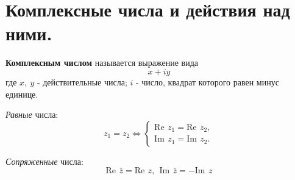 \documentclass[12pt]{extarticle}
\newcommand{\RE}{\mathrm{Re}\,}
\newcommand{\IM}{\mathrm{Im}\,}
\begin{document}
\tableofcontents\newpage

\section{Комплексные числа и действия над ними.}
\textbf{Комплексным числом} называется выражение вида
\begin{displaymath}
x+iy
\end{displaymath}
где $x,\ y$ - действительные числа; $i$ - число, квадрат которого равен
минус единице.
\par \textit{Равные} числа:
\begin{displaymath}
    z_{1}=z_{2} \Leftrightarrow
        \left\{
            \begin{array}{ll}
                \RE\ z_{1} = \RE\ z_{2},\\
                \IM\ z_{1} = \IM\ z_{2}.
            \end{array}
        \right.
\end{displaymath}
\par \textit{Сопряженные} числа:
\begin{displaymath}
    \RE\ \bar{z} = \RE\ z,\ \ \IM\ \bar{z} = -\IM\ z
\end{displaymath}
\end{document}

